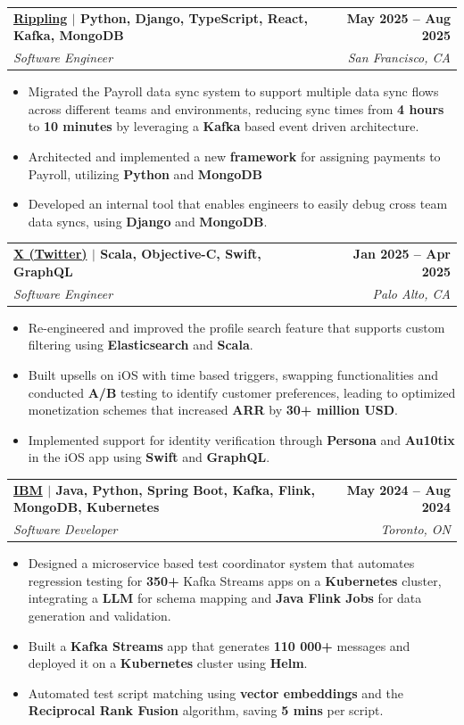 \documentclass[letterpaper,11pt]{article}
\makeatletter
\newcommand{\resumeItem}[1]{
  \item\small{
    {#1 \vspace{-3pt}}
  }
}
\newcommand{\resumeSubheading}[4]{
  \vspace{-2pt}\item
    \begin{tabular*}{1.0\textwidth}[t]{l@{\extracolsep{\fill}}r}
      \textbf{#1} & \textbf{\small #2} \\
      \textit{\small#3} & \textit{\small #4} \\
    \end{tabular*}\vspace{-7pt}
}
\newcommand{\resumeItemListStart}{\begin{itemize}[leftmargin=0.2in]}
\newcommand{\resumeItemListEnd}{\end{itemize}\vspace{-5pt}}
\makeatother
\begin{document}
    \resumeSubheading
    {{\href{https://www.rippling.com/}{\textcolor{NavyBlue}{Rippling}}} $|$ \textnormal{Python, Django, TypeScript, React, Kafka, MongoDB}}{May 2025 -- Aug 2025}
    {Software Engineer}{San Francisco, CA}
    \resumeItemListStart
      \resumeItem{Migrated the Payroll data sync system to support multiple data sync flows across different teams and environments, reducing sync times from \textbf{4 hours} to \textbf{10 minutes} by leveraging a \textbf{Kafka} based event driven architecture.}
      \resumeItem{Architected and implemented a new \textbf{framework} for assigning payments to Payroll, utilizing \textbf{Python} and \textbf{MongoDB}}
      \resumeItem{Developed an internal tool that enables engineers to easily debug cross team data syncs, using \textbf{Django} and \textbf{MongoDB}.}
    \resumeItemListEnd

    \resumeSubheading
    {{\href{https://x.com/}{\textcolor{NavyBlue}{X (Twitter)}}} $|$ \textnormal{Scala, Objective-C, Swift, GraphQL}}{Jan 2025 -- Apr 2025}
    {Software Engineer}{Palo Alto, CA}
    \resumeItemListStart
      \resumeItem{Re-engineered and improved the profile search feature that supports custom filtering using \textbf{Elasticsearch} and \textbf{Scala}.}
      \resumeItem{Built upsells on iOS with time based triggers, swapping functionalities and conducted \textbf{A/B} testing to identify customer preferences, leading to optimized monetization schemes that increased \textbf{ARR} by \textbf{30+ million USD}.}
      \resumeItem{Implemented support for identity verification through \textbf{Persona} and \textbf{Au10tix} in the iOS app using \textbf{Swift} and \textbf{GraphQL}.}
    \resumeItemListEnd

    \resumeSubheading
      {{\href{https://www.ibm.com/ca-en}{\textcolor{NavyBlue}{IBM}}} $|$ \textnormal{Java, Python, Spring Boot, Kafka, Flink, MongoDB, Kubernetes}}{May 2024 -- Aug 2024}
      {Software Developer}{Toronto, ON}
      \resumeItemListStart
        \resumeItem{Designed a microservice based test coordinator system that automates regression testing for \textbf{350+} Kafka Streams apps on a \textbf{Kubernetes} cluster, integrating a \textbf{LLM} for schema mapping and \textbf{Java Flink Jobs} for data generation and validation.}
        \resumeItem{Built a \textbf{Kafka Streams} app that generates \textbf{110 000+} messages and deployed it on a \textbf{Kubernetes} cluster using \textbf{Helm}.}
        \resumeItem{Automated test script matching using \textbf{vector embeddings} and the \textbf{Reciprocal Rank Fusion} algorithm, saving \textbf{5 mins} per script.}
      \resumeItemListEnd
\end{document}
